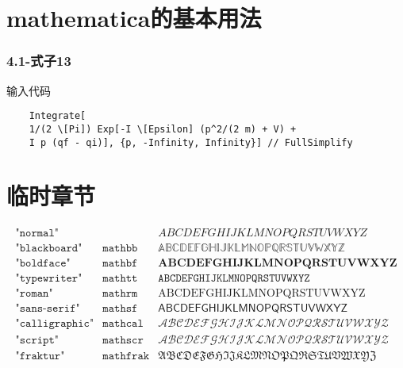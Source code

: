 \chapter{mathematica的基本用法}
\subsection*{4.1-式子13}
输入代码
\begin{lstlisting}
	Integrate[
	1/(2 \[Pi]) Exp[-I \[Epsilon] (p^2/(2 m) + V) + 
	I p (qf - qi)], {p, -Infinity, Infinity}] // FullSimplify
\end{lstlisting}
\chapter{临时章节}
\begin{equation}
	\begin{array}{ll|l}
		\texttt{"normal"}      &\texttt{}         & ABCDEFGHIJKLMNOPQRSTUVWXYZ\\
		\texttt{"blackboard"}  &\texttt{mathbb}  &\mathbb{ABCDEFGHIJKLMNOPQRSTUVWXYZ}\\
		\texttt{"boldface"}    &\texttt{mathbf}  &\mathbf{ABCDEFGHIJKLMNOPQRSTUVWXYZ}\\
		\texttt{"typewriter"}  &\texttt{mathtt}  &\mathtt{ABCDEFGHIJKLMNOPQRSTUVWXYZ}\\
		\texttt{"roman"}       &\texttt{mathrm}  &\mathrm{ABCDEFGHIJKLMNOPQRSTUVWXYZ}\\
		\texttt{"sans-serif"}  &\texttt{mathsf}  &\mathsf{ABCDEFGHIJKLMNOPQRSTUVWXYZ}\\
		\texttt{"calligraphic"}&\texttt{mathcal} &\mathcal{ABCDEFGHIJKLMNOPQRSTUVWXYZ}\\
		\texttt{"script"}      &\texttt{mathscr} &\mathscr{ABCDEFGHIJKLMNOPQRSTUVWXYZ}\\
		\texttt{"fraktur"}     &\texttt{mathfrak}&\mathfrak{ABCDEFGHIJKLMNOPQRSTUVWXYZ}\\
	\end{array}
\end{equation}
